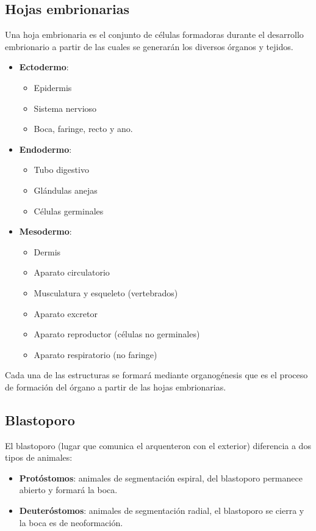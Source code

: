 \subsection{Hojas embrionarias}
Una hoja embrionaria es el conjunto de células formadoras durante el desarrollo embrionario a partir de las cuales se generarán los diversos órganos y tejidos.
\begin{itemize}[itemsep=0pt,parsep=0pt,topsep=0pt,partopsep=0pt]
    \item \textbf{Ectodermo}: 
    \begin{itemize}[itemsep=0pt,parsep=0pt,topsep=0pt,partopsep=0pt]
        \item Epidermis
        \item Sistema nervioso
        \item Boca, faringe, recto y ano.
    \end{itemize}
    \item \textbf{Endodermo}:
    \begin{itemize}[itemsep=0pt,parsep=0pt,topsep=0pt,partopsep=0pt]
        \item Tubo digestivo
        \item Glándulas anejas
        \item Células germinales
    \end{itemize}
    \item\textbf{Mesodermo}: 
    \begin{itemize}[itemsep=0pt,parsep=0pt,topsep=0pt,partopsep=0pt]
        \item Dermis
        \item Aparato circulatorio
        \item Musculatura y esqueleto (vertebrados)
        \item Aparato excretor
        \item Aparato reproductor (células no germinales)
        \item Aparato respiratorio (no faringe)
    \end{itemize}
\end{itemize}

Cada una de las estructuras se formará mediante organogénesis que es el proceso de formación del órgano a partir de las hojas embrionarias.
\subsection{Blastoporo}
El blastoporo (lugar que comunica el arquenteron con el exterior) diferencia a dos tipos de animales:
\begin{itemize}[itemsep=0pt,parsep=0pt,topsep=0pt,partopsep=0pt]
    \item \textbf{Protóstomos}: animales de segmentación espiral, del blastoporo permanece abierto y formará la boca.
    \item\textbf{Deuteróstomos}: animales de segmentación radial, el blastoporo se cierra y la boca es de neoformación.
\end{itemize}
